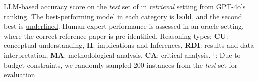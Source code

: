 \begin{table}[!t]
\caption{
LLM-based accuracy score on the \emph{test} set of \data in \emph{retrieval} setting from GPT-4o's ranking. The best-performing model in each category is \textbf{bold}, and the second best is {\underline{underlined}}. Human expert performance is assessed in an oracle setting, where the correct reference paper is pre-identified. Reasoning types: \textbf{CU}: conceptual understanding, \textbf{II}: implications and Inferences, \textbf{RDI}: results and data interpretation, \textbf{MA}: methodological analysis, \textbf{CA}: critical analysis. $^\dagger$: Due to budget constraints, we randomly sampled 200 instances from the \emph{test} set for evaluation.
}
\label{tab:detail_gpt_based}
\end{table}



